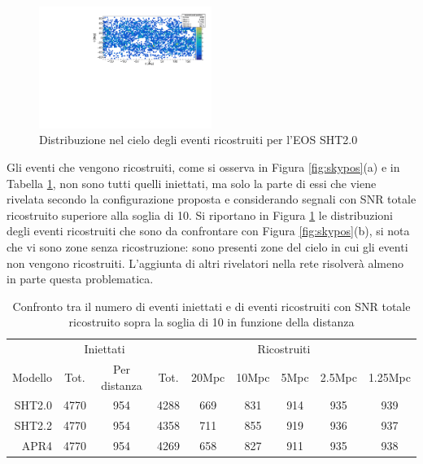 \begin{figure}
	\vspace{-10pt}
	\begin{center}
		\includegraphics[width=0.5\textwidth]{figures/Capitolo_3/report/RopositionSHT2_0spin1.pdf}
	\end{center}
	\vspace{-10pt}
	\caption{Distribuzione nel cielo degli eventi ricostruiti per l'EOS SHT2.0}
	\label{fig:skyposrec}
	\vspace{-10pt}
\end{figure}
Gli eventi che vengono ricostruiti, come si osserva in Figura \ref{fig:skypos}(a) e in Tabella \ref{tab:ricostruiti}, non sono tutti quelli iniettati, ma solo la parte di essi che viene rivelata secondo la configurazione proposta e considerando segnali con SNR totale ricostruito superiore alla soglia di 10. Si riportano in Figura \ref{fig:skyposrec} le distribuzioni degli eventi ricostruiti che sono da confrontare con Figura \ref{fig:skypos}(b), si nota che vi sono zone senza ricostruzione: sono presenti zone del cielo in cui gli eventi non vengono ricostruiti. L'aggiunta di altri rivelatori nella rete risolverà almeno in parte questa problematica. 
\begin{table}[hbt!]
	\centering
	\begin{tabular}{rcccccccc}
		\toprule
				&\multicolumn{2}{c}{Iniettati}	&\multicolumn{6}{c}{Ricostruiti}\\
		Modello	&Tot. &Per distanza	&Tot. &20Mpc	&10Mpc	&5Mpc	&2.5Mpc	&1.25Mpc\\
		\midrule
		SHT2.0	&4770	&954	&4288	&669	&831	&914	&935	&939\\
		SHT2.2	&4770	&954	&4358	&711	&855	&919	&936	&937\\
		APR4	&4770	&954	&4269	&658	&827	&911	&935	&938\\
		\bottomrule
	\end{tabular}
	\caption{Confronto tra il numero di eventi iniettati e di eventi ricostruiti con SNR totale ricostruito sopra la soglia di 10 in funzione della distanza}
	\label{tab:ricostruiti}
	\vspace{-10pt}
\end{table}

